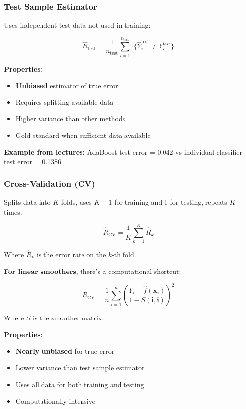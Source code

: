 \documentclass[12pt,a4paper]{article}
\begin{document}
\subsubsection{Test Sample Estimator}

Uses independent test data not used in training:

\begin{equation}
\hat{R}_{\text{test}} = \frac{1}{n_{\text{test}}} \sum_{i=1}^{n_{\text{test}}} \mathbb{I}\{\hat{Y}_i^{\text{test}} \neq Y_i^{\text{test}}\}
\end{equation}

\textbf{Properties:}
\begin{itemize}
    \item \textbf{Unbiased} estimator of true error
    \item Requires splitting available data
    \item Higher variance than other methods
    \item Gold standard when sufficient data available
\end{itemize}

\textbf{Example from lectures:} AdaBoost test error = 0.042 vs individual classifier test error = 0.1386

\subsubsection{Cross-Validation (CV)}

Splits data into $K$ folds, uses $K-1$ for training and 1 for testing, repeats $K$ times:

\begin{equation}
\hat{R}_{\text{CV}} = \frac{1}{K} \sum_{k=1}^K \hat{R}_k
\end{equation}

Where $\hat{R}_k$ is the error rate on the $k$-th fold.

\textbf{For linear smoothers}, there's a computational shortcut:

\begin{equation}
\hat{R}_{\text{CV}} = \frac{1}{n} \sum_{i=1}^n \left(\frac{Y_i - \hat{f}(\mathbf{x}_i)}{1 - S(\mathbf{i},\mathbf{i})}\right)^2
\end{equation}

Where $S$ is the smoother matrix.

\textbf{Properties:}
\begin{itemize}
    \item \textbf{Nearly unbiased} for true error
    \item Lower variance than test sample estimator
    \item Uses all data for both training and testing
    \item Computationally intensive
\end{itemize}
\end{document}
